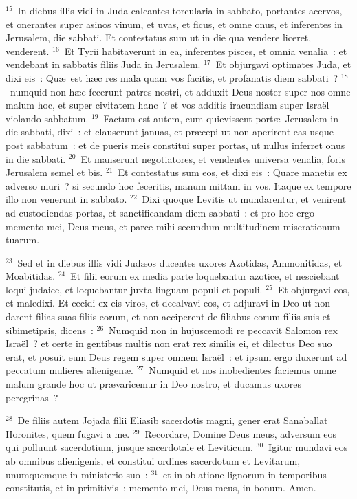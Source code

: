 ${}^{15}$~In diebus illis vidi in Juda calcantes torcularia in sabbato, portantes acervos, et onerantes super asinos vinum, et uvas, et ficus, et omne onus, et inferentes in Jerusalem, die sabbati. Et contestatus sum ut in die qua vendere liceret, venderent.
${}^{16}$~Et Tyrii habitaverunt in ea, inferentes pisces, et omnia venalia~: et vendebant in sabbatis filiis Juda in Jerusalem.
${}^{17}$~Et objurgavi optimates Juda, et dixi eis~: Qu\ae\ est h\ae c res mala quam vos facitis, et profanatis diem sabbati~?
${}^{18}$~numquid non h\ae c fecerunt patres nostri, et adduxit Deus noster super nos omne malum hoc, et super civitatem hanc~? et vos additis iracundiam super Isra\"el violando sabbatum.
${}^{19}$~Factum est autem, cum quievissent port\ae\ Jerusalem in die sabbati, dixi~: et clauserunt januas, et pr\ae cepi ut non aperirent eas usque post sabbatum~: et de pueris meis constitui super portas, ut nullus inferret onus in die sabbati.
${}^{20}$~Et manserunt negotiatores, et vendentes universa venalia, foris Jerusalem semel et bis.
${}^{21}$~Et contestatus sum eos, et dixi eis~: Quare manetis ex adverso muri~? si secundo hoc feceritis, manum mittam in vos. Itaque ex tempore illo non venerunt in sabbato.
${}^{22}$~Dixi quoque Levitis ut mundarentur, et venirent ad custodiendas portas, et sanctificandam diem sabbati~: et pro hoc ergo memento mei, Deus meus, et parce mihi secundum multitudinem miserationum tuarum.


${}^{23}$~Sed et in diebus illis vidi Jud\ae os ducentes uxores Azotidas, Ammonitidas, et Moabitidas.
${}^{24}$~Et filii eorum ex media parte loquebantur azotice, et nesciebant loqui judaice, et loquebantur juxta linguam populi et populi.
${}^{25}$~Et objurgavi eos, et maledixi. Et cecidi ex eis viros, et decalvavi eos, et adjuravi in Deo ut non darent filias suas filiis eorum, et non acciperent de filiabus eorum filiis suis et sibimetipsis, dicens~:
${}^{26}$~Numquid non in hujuscemodi re peccavit Salomon rex Isra\"el~? et certe in gentibus multis non erat rex similis ei, et dilectus Deo suo erat, et posuit eum Deus regem super omnem Isra\"el~: et ipsum ergo duxerunt ad peccatum mulieres alienigen\ae .
${}^{27}$~Numquid et nos inobedientes faciemus omne malum grande hoc ut pr\ae varicemur in Deo nostro, et ducamus uxores peregrinas~?


${}^{28}$~De filiis autem Jojada filii Eliasib sacerdotis magni, gener erat Sanaballat Horonites, quem fugavi a me.
${}^{29}$~Recordare, Domine Deus meus, adversum eos qui polluunt sacerdotium, jusque sacerdotale et Leviticum.
${}^{30}$~Igitur mundavi eos ab omnibus alienigenis, et constitui ordines sacerdotum et Levitarum, unumquemque in ministerio suo~:
${}^{31}$~et in oblatione lignorum in temporibus constitutis, et in primitivis~: memento mei, Deus meus, in bonum. Amen.
